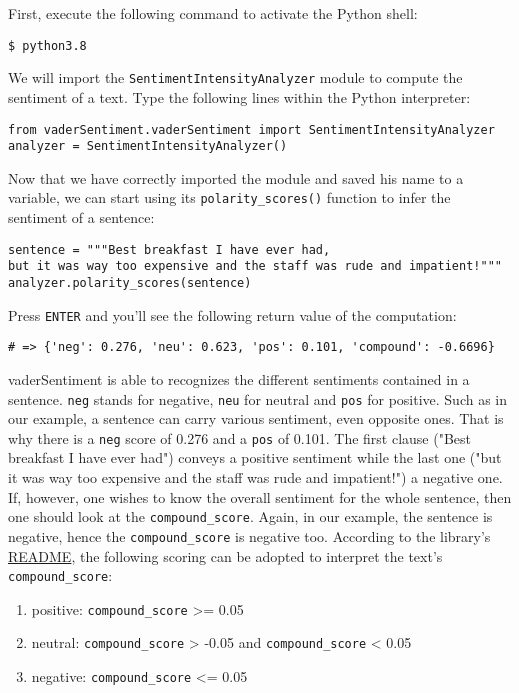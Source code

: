 	First, execute the following command to activate the Python shell:
	\begin{Verbatim}
$ python3.8
	\end{Verbatim}
	We will import the \verb|SentimentIntensityAnalyzer| module to compute the sentiment of a text. Type the following lines within the Python interpreter:
	\begin{Verbatim}
from vaderSentiment.vaderSentiment import SentimentIntensityAnalyzer
analyzer = SentimentIntensityAnalyzer()
	\end{Verbatim}
Now that we have correctly imported the module and saved his name to a variable, we can start using its \verb|polarity_scores()| function to infer the sentiment of a sentence:
	\begin{Verbatim}
sentence = """Best breakfast I have ever had, 
but it was way too expensive and the staff was rude and impatient!"""
analyzer.polarity_scores(sentence)
	\end{Verbatim}
	Press \verb|ENTER| and you'll see the following return value of the computation:
\begin{Verbatim}
# => {'neg': 0.276, 'neu': 0.623, 'pos': 0.101, 'compound': -0.6696}
\end{Verbatim}
	vaderSentiment is able to recognizes the different sentiments contained in a sentence. \verb|neg| stands for negative, \verb|neu| for neutral and \verb|pos| for positive. Such as in our example, a sentence can carry various sentiment, even opposite ones. That is why there is a \verb|neg| score of 0.276 and a \verb|pos| of 0.101. The first clause ("Best breakfast I have ever had") conveys a positive sentiment while the last one ("but it was way too expensive and the staff was rude and impatient!") a negative one. If, however, one wishes to know the overall sentiment for the whole sentence, then one should look at the \verb|compound_score|. Again, in our example, the sentence is negative, hence the \verb|compound_score| is negative too. According to the library's \href{https://github.com/cjhutto/vaderSentiment#about-the-scoring}{README}, the following scoring can be adopted to interpret the text's \verb|compound_score|: 
	
	\begin{enumerate}
		\item [] positive: \verb|compound_score| >= 0.05
		\item [] neutral: \verb|compound_score| > -0.05 and \verb|compound_score| < 0.05
		\item [] negative: \verb|compound_score| <= 0.05
	\end{enumerate}

